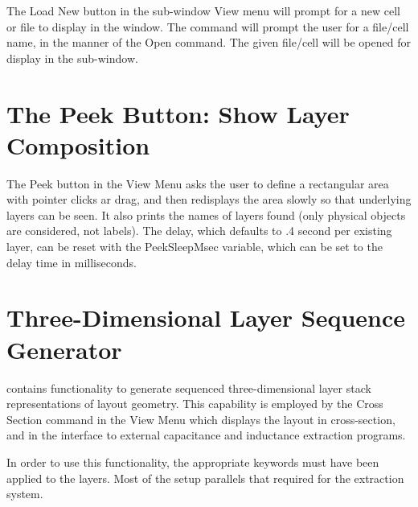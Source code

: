 The {\cb Load New} button in the sub-window {\cb View} menu will prompt
for a new cell or file to display in the window.  The command will
prompt the user for a file/cell name, in the manner of the {\cb Open}
command.  The given file/cell will be opened for display in the
sub-window.


\section{The {\cb Peek} Button: Show Layer Composition}
The {\cb Peek} button in the {\cb View Menu} asks the user to define a
rectangular area with pointer clicks ar drag, and then redisplays the
area slowly so that underlying layers can be seen.  It also prints the
names of layers found (only physical objects are considered, not
labels).  The delay, which defaults to .4 second per existing layer,
can be reset with the {\et PeekSleepMsec} variable, which can be set
to the delay time in milliseconds. 

\section{Three-Dimensional Layer Sequence Generator}
\label{ldb3d}

{\Xic} contains functionality to generate sequenced three-dimensional
layer stack representations of layout geometry.  This capability is
employed by the {\cb Cross Section} command in the {\cb View Menu}
which displays the layout in cross-section, and in the interface to
external capacitance and inductance extraction programs.

In order to use this functionality, the appropriate keywords must have
been applied to the layers.  Most of the setup parallels that required
for the extraction system.


